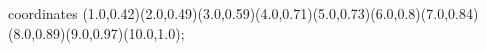 					coordinates { (1.0,0.42)(2.0,0.49)(3.0,0.59)(4.0,0.71)(5.0,0.73)(6.0,0.8)(7.0,0.84)(8.0,0.89)(9.0,0.97)(10.0,1.0)};